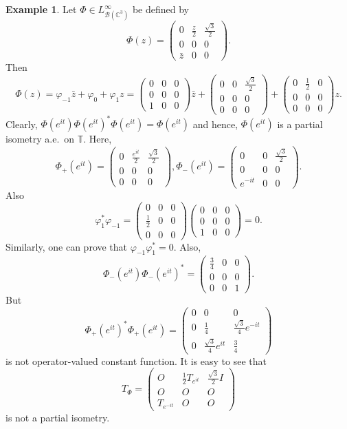 \documentclass[12pt]{amsart}
\newcommand{\clb}{\mathcal{B}}
\newcommand{\C}{\mathbb{C}}
\newcommand{\T}{\mathbb{T}}
\theoremstyle{definition}
\theoremstyle{plain}
\theoremstyle{definition}
\newtheorem{ex}[thm]{Example}
\numberwithin{equation}{section}
\let\phi=\varphi
\begin{document}
\begin{ex}
Let $\Phi \in L^\infty_{\clb(\C^3)}$ be defined by
\[
\Phi(z)=\begin{pmatrix}
0&\frac{z}{2} & \frac{\sqrt{3}}{2} \\
0 &0 &0\\
\bar{z} & 0 & 0
\end{pmatrix}.
\]
Then
\[
\Phi(z)=\phi_{-1}\bar{z} + \phi_{0} + \phi_{1}z = 
\begin{pmatrix}
0&0 & 0 \\
0 &0 &0\\
1 & 0 & 0
\end{pmatrix}\bar{z}
+  
\begin{pmatrix}
0& 0 & \frac{\sqrt{3}}{2} \\
0 &0 &0\\
0 & 0 & 0
\end{pmatrix}
+ 
\begin{pmatrix}
0&\frac{1}{2} & 0 \\
0 &0 &0\\
0 & 0 & 0
\end{pmatrix}z.
\]
Clearly, $\Phi(e^{it})\Phi(e^{it})^*\Phi(e^{it})=\Phi(e^{it})$ and hence, 
$\Phi(e^{it})$ is a partial isometry a.e.\ on $\T$.
Here,
\[
\Phi_+(e^{it})=\begin{pmatrix}
0&\frac{e^{it}}{2} & \frac{\sqrt{3}}{2}\\
0 &0 &0\\
0 &0 & 0
\end{pmatrix},
\Phi_-(e^{it})=\begin{pmatrix}
 0 &0& \frac{\sqrt{3}}{2}\\
0 &0 &0\\
e^{-it} &0 &0
\end{pmatrix}.
\]
Also
\[
\phi_1^*\phi_{-1}= \begin{pmatrix}
0&0&0\\
\frac{1}{2} &0&0\\
0&0&0
\end{pmatrix}
\begin{pmatrix}
0 & 0& 0\\
0&0&0\\
1&0&0
\end{pmatrix}=0.
\]
Similarly, one can prove that $\phi_{-1}\phi_{1}^*=0$. Also,
\[
\Phi_-(e^{it})\Phi_-(e^{it})^*=
\begin{pmatrix}
\frac{3}{4} & 0& 0\\
0&0&0\\
0 &0&1
\end{pmatrix}.
\]
But
\[
\Phi_+(e^{it})^*\Phi_+(e^{it})=
\begin{pmatrix}
0 & 0& 0\\
0&\frac{1}{4}&\frac{\sqrt{3}}{4}e^{-it}\\
0&\frac{\sqrt{3}}{4}e^{it} &\frac{3}{4}
\end{pmatrix}
\]
is not operator-valued constant function. It is easy to see that
\[T_\Phi=
\begin{pmatrix}
O &\frac{1}{2} T_{e^{it}}& \frac{\sqrt 3}{2}I\\
O & O & O\\
T_{e^{-it}} & O &O
\end{pmatrix}
\]
is not a partial isometry. 
\end{ex}
\end{document}
